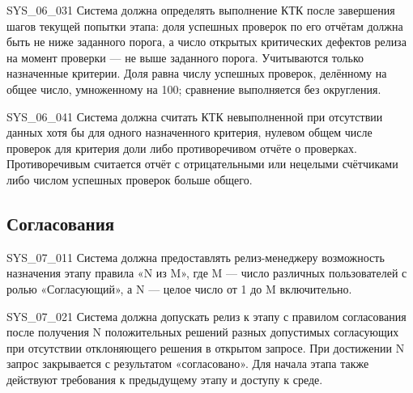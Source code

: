 \documentclass{tpks}
\begin{document}
\begin{req}{SYS_06_03}{1}
Система должна определять выполнение КТК после завершения шагов текущей попытки этапа: доля успешных проверок по его отчётам должна быть не ниже заданного порога, а число открытых критических дефектов релиза на момент проверки — не выше заданного порога.
Учитываются только назначенные критерии. Доля равна числу успешных проверок,
делённому на общее число, умноженному на 100; сравнение выполняется без округления.
\end{req}

\begin{req}{SYS_06_04}{1}
Система должна считать КТК невыполненной при отсутствии данных хотя бы для одного назначенного критерия, нулевом общем числе проверок для критерия доли либо противоречивом отчёте о проверках.
Противоречивым считается отчёт с отрицательными или нецелыми счётчиками либо
числом успешных проверок больше общего.
\end{req}

\subsection{Согласования}

\begin{req}{SYS_07_01}{1}
Система должна предоставлять релиз-менеджеру возможность назначения этапу правила «N из M», где M — число различных пользователей с ролью «Согласующий», а N — целое число от 1 до M включительно.
\end{req}

\begin{req}{SYS_07_02}{1}
Система должна допускать релиз к этапу с правилом согласования после получения N положительных решений разных допустимых согласующих при отсутствии отклоняющего решения в открытом запросе.
При достижении N запрос закрывается с результатом «согласовано».
Для начала этапа также действуют требования к предыдущему этапу и доступу к среде.
\end{req}
\end{document}
